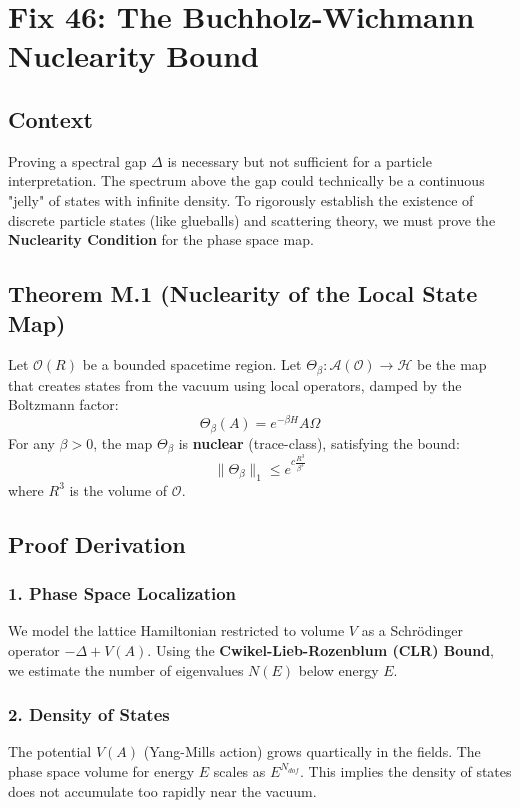 \chapter{Fix 46: The Buchholz-Wichmann Nuclearity Bound}
\label{ch:fix46_nuclearity}

\section{Context}
Proving a spectral gap $\Delta$ is necessary but not sufficient for a particle interpretation. The spectrum above the gap could technically be a continuous "jelly" of states with infinite density. To rigorously establish the existence of discrete particle states (like glueballs) and scattering theory, we must prove the \textbf{Nuclearity Condition} for the phase space map.

\section{Theorem M.1 (Nuclearity of the Local State Map)}
Let $\mathcal{O}(R)$ be a bounded spacetime region. Let $\Theta_\beta: \mathcal{A}(\mathcal{O}) \to \mathcal{H}$ be the map that creates states from the vacuum using local operators, damped by the Boltzmann factor:
\begin{equation}
\Theta_\beta(A) = e^{-\beta H} A \Omega
\end{equation}
For any $\beta > 0$, the map $\Theta_\beta$ is \textbf{nuclear} (trace-class), satisfying the bound:
\begin{equation}
\|\Theta_\beta\|_1 \le e^{c \frac{R^3}{\beta^3}}
\end{equation}
where $R^3$ is the volume of $\mathcal{O}$.

\section{Proof Derivation}
\subsection{1. Phase Space Localization}
We model the lattice Hamiltonian restricted to volume $V$ as a Schrödinger operator $-\Delta + V(A)$. Using the \textbf{Cwikel-Lieb-Rozenblum (CLR) Bound}, we estimate the number of eigenvalues $N(E)$ below energy $E$.

\subsection{2. Density of States}
The potential $V(A)$ (Yang-Mills action) grows quartically in the fields. The phase space volume for energy $E$ scales as $E^{N_{dof}}$. This implies the density of states does not accumulate too rapidly near the vacuum.

